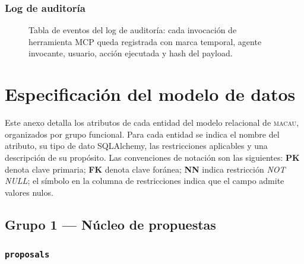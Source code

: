 \subsection*{Log de auditoría}

\begin{figure}[H]
  \centering
  \caption[Log de auditoría MCP.]{Tabla de eventos del log de auditoría:
    cada invocación de herramienta MCP queda registrada con marca temporal,
    agente invocante, usuario, acción ejecutada y hash del payload.}
  \label{fig:cap_log_auditoria}
\end{figure}

\chapter{Especificación del modelo de datos}
\label{anexo:modelo_datos}

Este anexo detalla los atributos de cada entidad del modelo relacional de
\textsc{macau}, organizados por grupo funcional. Para cada entidad se indica
el nombre del atributo, su tipo de dato SQLAlchemy, las restricciones
aplicables y una descripción de su propósito. Las convenciones de notación
son las siguientes: \textbf{PK} denota clave primaria; \textbf{FK} denota
clave foránea; \textbf{NN} indica restricción \textit{NOT NULL}; el símbolo
\textemdash{} en la columna de restricciones indica que el campo admite
valores nulos.

\section*{Grupo 1 — Núcleo de propuestas}
\label{anexo:grupo1_modelo_datos}

\subsection*{\texttt{proposals}}

